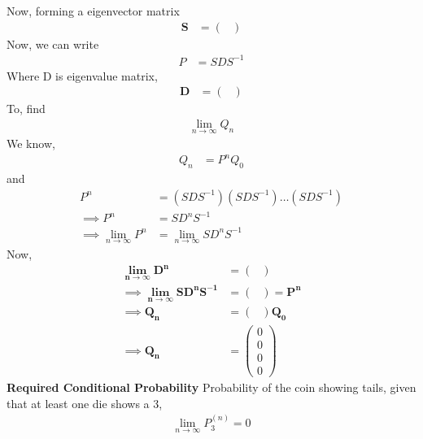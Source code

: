 \documentclass[journal,12pt,two column]{IEEEtran}
\providecommand{\prt}[2]{\ensuremath{P_{#1}^{\left(#2\right)} }}        %
\theoremstyle{remark}
\newcommand{\myvec}[1]{\ensuremath{\begin{pmatrix}#1\end{pmatrix}}}
\let\vec\mathbf
\begin{document}
Now, forming a eigenvector matrix\\
\begin{align}
\vec{S} &= \myvec{}
\end{align}
Now, we can write \\
\begin{align}
P &= SDS^{-1}
\end{align}
Where D is eigenvalue matrix,\\
\begin{align}
\vec{D} &= \myvec{}
\end{align}
To, find\\
\begin{align}
\lim_{n \to \infty} Q_{n} 
\end{align}
We know,
\begin{align}
Q_n &= P^{n}Q_0
\end{align}
and
\begin{align}
P^{n} &= (SDS^{-1})(SDS^{-1}) \dots (SDS^{-1})\\
\implies P^{n} &= SD^{n}S^{-1}\\
\implies \lim_{n \to \infty}P^{n} &= \lim_{n \to \infty}SD^{n}S^{-1}
\end{align}
Now,
\begin{align}
\vec{\lim_{n \to \infty}D^{n}} &= \myvec{}\\ 
\implies \vec{\lim_{n \to \infty}SD^{n}S^{-1}} &= \myvec{} = \vec{P^{n}}\\
\implies \vec{Q_n} &= \myvec{}\vec{Q_0}\\
\implies \vec{Q_n} &= \myvec{0 \\ 0 \\ 0 \\ 0} 
\end{align}
\textbf{Required Conditional Probability}
    Probability of the coin showing tails, given that at least one die shows a 3,
    \begin{align}
       \lim_{n \to \infty} \prt{3}{n} = 0
    \end{align}
    
\end{document}
